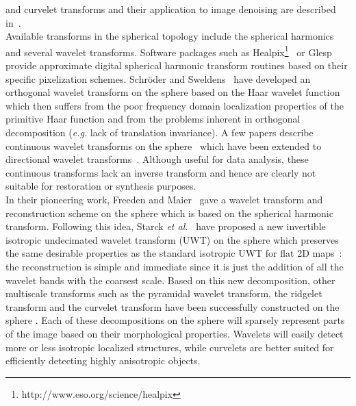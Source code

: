 and curvelet transforms and their application to image denoising are described in~\cite{starck:sta01_3}.\\
%
Available transforms in the spherical topology include the spherical harmonics and several 
wavelet transforms. Software packages such as Healpix\footnote {http://www.eso.org/science/healpix}~\cite{pixel:healpix} 
or Glesp~\cite{pixel:glesp} provide approximate digital spherical harmonic transform routines 
based on their specific pixelization schemes. Schr{\"o}der and Sweldens~\cite{wave:sweldens95a} 
have developed an orthogonal wavelet transform on the sphere based on the Haar wavelet function 
which then suffers from the poor frequency domain localization properties of the primitive Haar function 
and from the problems inherent in orthogonal decomposition (\emph{e.g.} lack of translation invariance). 
A few papers describe continuous wavelet transforms on the sphere~\cite{wave:antoine99bis,wave:cayon01,wave:holschneider96,wave:wiaux,bogdanova} 
which have been extended to directional wavelet transforms~\cite{wave:wiaux2005,wave:hobson04}. 
Although useful for data analysis, these continuous transforms lack an inverse transform and hence 
are clearly not suitable for restoration or synthesis purposes.\\
%
In their pioneering  work, Freeden and Maier~\cite{freeden02,freeden03} gave a wavelet transform 
and reconstruction scheme on the sphere which is based on the spherical harmonic transform. 
Following this idea, Starck \emph{et al.}~\cite{starck:sta05_2} have proposed a new invertible 
isotropic undecimated wavelet transform (UWT) on the sphere which preserves the same desirable 
properties as the standard isotropic UWT for flat 2D maps~\cite{starck:book98}: the reconstruction 
is simple and immediate since it is just the addition of all the wavelet bands with the coarsest scale. 
Based on this new decomposition, other multiscale transforms such as the pyramidal wavelet transform, 
the ridgelet transform and the curvelet transform have been successfully constructed on the sphere \cite{starck:sta05_2}. 
%
Each of these decompositions on the sphere will sparsely represent parts of the image based 
on their morphological properties. Wavelets will easily detect more or less isotropic localized 
structures, while curvelets are better suited for efficiently detecting highly anisotropic objects.\\
%
